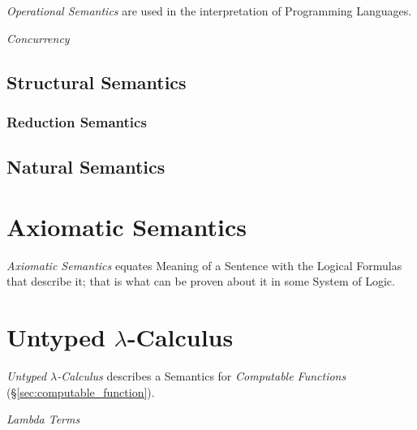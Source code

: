 \documentclass{article}
\begin{document}
\emph{Operational Semantics} are used in the interpretation of
Programming Languages.

\emph{Concurrency}

\subsection{Structural Semantics}

\subsubsection{Reduction Semantics}

\subsection{Natural Semantics}



\section{Axiomatic Semantics}

\emph{Axiomatic Semantics} equates Meaning of a Sentence with the
Logical Formulas that describe it; that is what can be proven about it
in some System of Logic.



\section{Untyped $\lambda$-Calculus}\label{sec:untyped_lambda}

\emph{Untyped $\lambda$-Calculus} describes a Semantics for
\emph{Computable Functions} (\S\ref{sec:computable_function}).

\emph{Lambda Terms}
\end{document}
